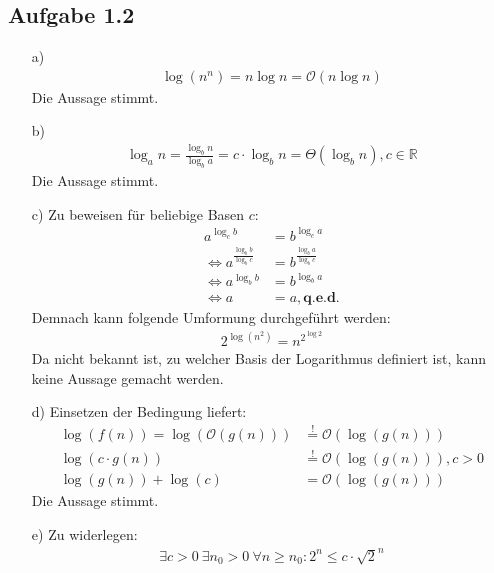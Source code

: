 \documentclass{article}
\begin{document}
    \subsection*{Aufgabe 1.2}
    \begin{enumerate}
        \item[a)]
        \begin{align*}
            \log\left(n^n\right) = n \log n = \mathcal{O}\left(n \log n\right)
        \end{align*} Die Aussage stimmt. 
        \item[b)] 
        \begin{align*}
            \log_a n = \frac{\log_b n}{\log_b a} = c \cdot \log_b n = \Theta\left(\log_b n\right), c \in \mathbb{R}
        \end{align*} Die Aussage stimmt. 
        \item[c)]
        Zu beweisen für beliebige Basen $c$: 
        \begin{align*}
            a^{\log_c b} &= b^{\log_c a}\\
            \Leftrightarrow a^{\frac{\log_b b}{\log_b c}} &= b^{\frac{\log_b a}{\log_b c}}\\
            \Leftrightarrow a^{\log_b b} &= b^{\log_b a}\\
            \Leftrightarrow a &= a, \textbf{q.e.d.}
        \end{align*} 
        Demnach kann folgende Umformung durchgeführt werden:
        \begin{align*}
            2^{\log \left(n^2\right)} = n^{2 ^{\log 2}}
        \end{align*}
        Da nicht bekannt ist, zu welcher Basis der Logarithmus definiert ist, kann keine Aussage gemacht werden. 
        \item[d)]
        Einsetzen der Bedingung liefert: 
        \begin{align*}
            \log(f(n)) = \log(\mathcal{O}(g(n))) &\stackrel{!}{=} \mathcal{O}(\log(g(n)))\\
            \log(c\cdot g(n)) &\stackrel{!}{=} \mathcal{O}(\log(g(n))), c>0\\
            \log(g(n)) + \log(c) &= \mathcal{O}(\log(g(n)))
        \end{align*} 
        Die Aussage stimmt.
        \item[e)]
        Zu widerlegen:
        \begin{align*}
            \exists c>0 \: \exists n_0>0 \: \forall n \ge n_0: 2^n \le c \cdot \sqrt{2}^n

\end{align*}
\end{enumerate}
\end{document}
